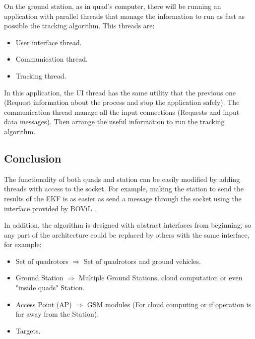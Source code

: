 	On the ground station, as in quad's computer, there will be running an application with parallel threads that manage the information to run as fast as possible the tracking algorithm. This threads are:

	\begin{itemize}
		\item User interface thread.
		\item Communication thread.
		\item Tracking thread.
	\end{itemize}

	In this application, the UI thread has the same utility that the previous one (Request information about the process and stop the application safely). The communication thread manage all the input connections (Requests and input data messages). Then arrange the useful information to run the tracking algorithm.
	
\subsection{Conclusion}
The functionality of both quads and station can be easily modified by adding threads with access to the socket. For example, making the station to send the results of the EKF is as easier as send a message through the socket using the interface provided by BOViL \cite{BOViL}. 

In addition, the algorithm is designed with abstract interfaces from beginning, so any part of the architecture could be replaced by others with the same interface, for example:

\begin{itemize}
  \item Set of quadrotors $\Longrightarrow$ Set of quadrotors and ground vehicles.
  \item Ground Station $\Longrightarrow$ Multiple Ground Stations, cloud computation \cite{Cloud_computing} or even "inside quads" Station.
  \item Access Point (AP) $\Longrightarrow$ GSM modules (For cloud computing or if operation is far away from the Station).
  \item Targets.
\end{itemize}


